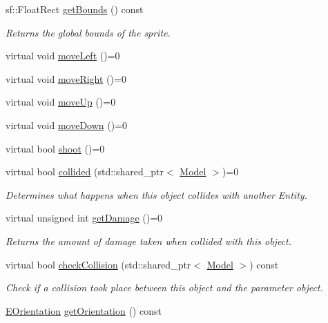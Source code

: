 \begin{DoxyCompactItemize}
sf\-::\-Float\-Rect \hyperlink{classmodels_1_1Model_a7922087cc2f5033eb5123e6bc5328434}{get\-Bounds} () const 
\begin{DoxyCompactList}\small\item\em \-Returns the global bounds of the sprite. \end{DoxyCompactList}\item 
virtual void \hyperlink{classmodels_1_1Model_aeec183545b665d49bf574dc6a5d6c164}{move\-Left} ()=0
\item 
virtual void \hyperlink{classmodels_1_1Model_a69c77dcd339e471b724b3ec6f5f60470}{move\-Right} ()=0
\item 
virtual void \hyperlink{classmodels_1_1Model_a905973d6e2909463f6438cc5fe67ddce}{move\-Up} ()=0
\item 
virtual void \hyperlink{classmodels_1_1Model_ae6dce0ff02579fc145e09959b4f07a92}{move\-Down} ()=0
\item 
virtual bool \hyperlink{classmodels_1_1Model_a388ad317aa487941903b6bd2845639e5}{shoot} ()=0
\item 
virtual bool \hyperlink{classmodels_1_1Model_a27a9b03a4e57a960e1303d7c4b85817c}{collided} (std\-::shared\-\_\-ptr$<$ \hyperlink{classmodels_1_1Model}{\-Model} $>$)=0
\begin{DoxyCompactList}\small\item\em \-Determines what happens when this object collides with another \-Entity. \end{DoxyCompactList}\item 
virtual unsigned int \hyperlink{classmodels_1_1Model_a503f6b5be2c6502733fe747be050a296}{get\-Damage} ()=0
\begin{DoxyCompactList}\small\item\em \-Returns the amount of damage taken when collided with this object. \end{DoxyCompactList}\item 
virtual bool \hyperlink{classmodels_1_1Model_a38f1f6b751de4f613763373040589ee6}{check\-Collision} (std\-::shared\-\_\-ptr$<$ \hyperlink{classmodels_1_1Model}{\-Model} $>$) const 
\begin{DoxyCompactList}\small\item\em \-Check if a collision took place between this object and the parameter object. \end{DoxyCompactList}\item 
\hyperlink{namespacemodels_adec64ede5178a8b8fed882b3790d423d}{\-E\-Orientation} \hyperlink{classmodels_1_1Model_ac4be513f4d41824ddcd81aa68e415af8}{get\-Orientation} () const 

\end{DoxyCompactItemize}
